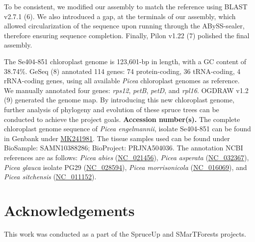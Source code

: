 \documentclass[titlepage,11pt, oneside]{article}   	%
\begin{document}
To be consistent, we modified our assembly to match the reference using BLAST v2.7.1 (6). We also introduced a gap, at the terminals of our assembly, which allowed circularization of the sequence upon running through the ABySS-sealer, therefore ensuring sequence completion. Finally, Pilon v1.22 (7) polished the final assembly.
\newline
\par
The Se404-851 chloroplast genome is 123,601-bp in length, with a GC content of 38.74\%. GeSeq (8) annotated 114 genes: 74 protein-coding, 36 tRNA-coding, 4 rRNA-coding genes, using all available \textit{Picea} chloroplast genomes as reference. We manually annotated four genes: \textit{rps12}, \textit{petB}, \textit{petD}, and \textit{rpl16}. OGDRAW v1.2 (9) generated the genome map. By introducing this new chloroplast genome, further analysis of phylogeny and evolution of these spruce trees can be conducted to achieve the project goals.
\newline
\newline
\textbf{Accession number(s).} The complete chloroplast genome sequence of \textit{Picea engelmannii}, isolate Se404-851 can be found in Genbank under \href{https://www.ncbi.nlm.nih.gov/nuccore/MK241981}{MK241981}. The tissue samples used can be found under BioSample: SAMN10388286; BioProject: PRJNA504036. The annotation NCBI references are as follows: \textit{Picea abies} (\href{https://www.ncbi.nlm.nih.gov/nuccore/NC_021456}{NC\_021456}), \textit{Picea asperata} (\href{https://www.ncbi.nlm.nih.gov/nuccore/NC_032367}{NC\_032367}), \textit{Picea glauca} isolate PG29 (\href{https://www.ncbi.nlm.nih.gov/nuccore/NC_028594}{NC\_028594}), \textit{Picea morrisonicola} (\href{https://www.ncbi.nlm.nih.gov/nuccore/NC_016069}{NC\_016069}), and \textit{Picea sitchensis} (\href{https://www.ncbi.nlm.nih.gov/nuccore/NC_011152}{NC\_011152}).

\section*{Acknowledgements}
This work was conducted as a part of the SpruceUp and SMarTForests projects.
\end{document}
